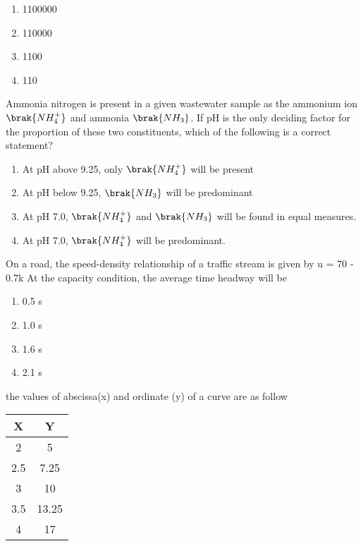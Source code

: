 \begin{enumerate}
    \item 1100000
    \item 110000
    \item 1100
    \item 110
\end{enumerate}
\bigskip
\item Ammonia nitrogen is present in a given wastewater sample as the ammonium ion $\brak{NH^+_4}$ and ammonia $\brak{NH_3}$. If pH is the only deciding factor for the proportion of these two constituents, which of the following is a correct statement?
\begin{enumerate}
    \item At pH above 9.25, only $\brak{NH^+_4}$  will be present
    \item At pH below 9.25, $\brak{NH_3}$ will be predominant
    \item At pH 7.0, $\brak{NH^+_4}$ and $\brak{NH_3}$  will be found in equal measures.
    \item At pH 7.0, $\brak{NH^+_4}$  will be predominant.

\end{enumerate}
\bigskip
\item On a road, the speed-density relationship of a traffic stream is given by u = 70 - 0.7k At the capacity condition, the average time headway will be
\begin{enumerate}
    \item 0.5 s
    \item 1.0 s
    \item 1.6 s
    \item 2.1 s
\end{enumerate}
\bigskip
\item the values of abscissa(x) and ordinate (y) of a curve are as follow 

\begin{tabular}{|c|c|}
\hline
\textbf{X} & \textbf{Y} \\
\hline
2 & 5\\
\hline
2.5 & 7.25\\
\hline
3 & 10\\
\hline 
3.5 & 13.25\\
\hline 
4 & 17\\
\hline
\end{tabular}

